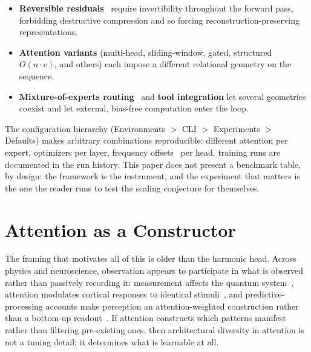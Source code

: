 \begin{itemize}[noitemsep]
    \paperFramingFramework
    \item \textbf{Reversible residuals}~\cite{gomez2017reversible} require invertibility throughout the forward pass, forbidding destructive compression and so forcing reconstruction-preserving representations.
    \item \textbf{Attention variants} (multi-head, sliding-window, gated, structured $O(n\cdot c)$, and others) each impose a different relational geometry on the sequence.
    \item \textbf{Mixture-of-experts routing}~\cite{shazeer2017outrageously} and \textbf{tool integration} let several geometries coexist and let external, bias-free computation enter the loop.
\end{itemize}

\paperOptimizationSection

The configuration hierarchy (Environments $>$ CLI $>$ Experiments $>$ Defaults) makes arbitrary combinations reproducible: different attention per expert, optimizers per layer, frequency offsets~\cite{time2vec2019,tancik2020} per head. \paperRunsLogged{} training runs are documented in the run history. This paper does not present a benchmark table, by design: the framework is the instrument, and the experiment that matters is the one the reader runs to test the scaling conjecture for themselves.

\section{Attention as a Constructor}
\label{sec:constructor}

The framing that motivates all of this is older than the harmonic head. Across physics and neuroscience, observation appears to participate in what is observed rather than passively recording it: measurement affects the quantum system~\cite{heisenberg1927uncertainty}, attention modulates cortical responses to identical stimuli~\cite{treue1996attentional,kastner2000mechanisms}, and predictive-processing accounts make perception an attention-weighted construction rather than a bottom-up readout~\cite{friston2010free,clark2013whatever}. If attention constructs which patterns manifest rather than filtering pre-existing ones, then architectural diversity in attention is not a tuning detail; it determines what is learnable at all.


